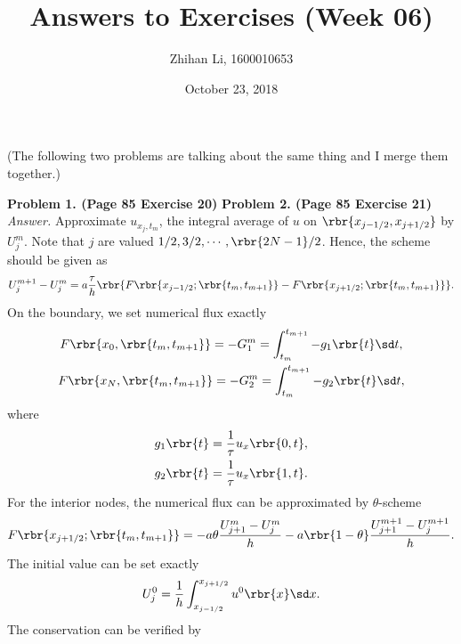 \documentclass[english, nochinese]{pnote}
\title{Answers to Exercises (Week 06)}
\author{Zhihan Li, 1600010653}
\date{October 23, 2018}
\begin{document}
\maketitle

(The following two problems are talking about the same thing and I merge them together.)

\textbf{Problem 1. (Page 85 Exercise 20)} \textbf{Problem 2. (Page 85 Exercise 21)} \textit{Answer.} Approximate $ u_{ x_j, t_m } $, the integral average of $u$ on $ \rbr{ x_{ j - 1 / 2 }, x_{ j + 1 / 2 } } $ by $U_j^m$. Note that $j$ are valued $ 1 / 2, 3 / 2, \cdots, \rbr{ 2 N - 1 } / 2 $. Hence, the scheme should be given as
\begin{equation}
U_j^{ m + 1 } - U_j^m = a \frac{\tau}{h} \rbr{ F \rbr{ x_{ j - 1 / 2 }; \rbr{ t_m, t_{ m + 1 } } } - F \rbr{ x_{ j + 1 / 2 }; \rbr{ t_m, t_{ m + 1 } } } }.
\end{equation}
On the boundary, we set numerical flux exactly
\begin{gather}
F \rbr{ x_0, \rbr{ t_m, t_{ m + 1 } } } = -G_1^m = \int_{t_m}^{t_{ m + 1 }} -g_1 \rbr{t} \sd t,\\
F \rbr{ x_N, \rbr{ t_m, t_{ m + 1 } } } = -G_2^m = \int_{t_m}^{t_{ m + 1 }} -g_2 \rbr{t} \sd t,
\end{gather}
where
\begin{gather}
g_1 \rbr{t} = \frac{1}{\tau} u_x \rbr{ 0, t }, \\
g_2 \rbr{t} = \frac{1}{\tau} u_x \rbr{ 1, t }.
\end{gather}
For the interior nodes, the numerical flux can be approximated by $\theta$-scheme
\begin{equation}
F \rbr{ x_{ j + 1 / 2 }; \rbr{ t_m, t_{ m + 1 } } } = -a \theta \frac{ U_{ j + 1 }^m - U_j^m }{h} - a \rbr{ 1 - \theta } \frac{ U_{ j + 1 }^{ m + 1 } - U_j^{ m + 1 } }{h}.
\end{equation}
The initial value can be set exactly
\begin{equation}
U_j^0 = \frac{1}{h} \int_{x_{ j - 1 / 2 }}^{x_{ j + 1 / 2 }} u^0 \rbr{x} \sd x.
\end{equation}
The conservation can be verified by
\end{document}
